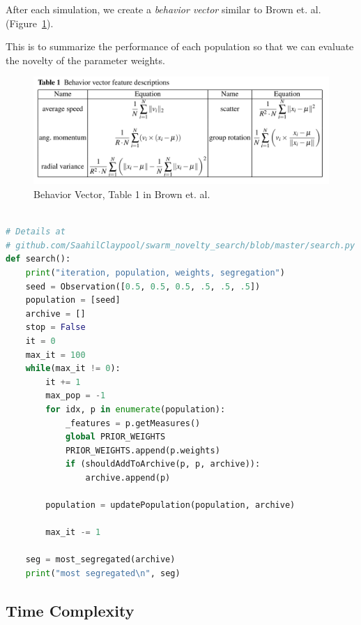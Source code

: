 After each simulation, we create a \emph{behavior vector} similar to Brown et. al. (Figure~\ref{fig:vec}).

This is to summarize the performance of each population so that we can evaluate the novelty of the parameter weights. 

\begin{figure}
    \centering
    \includegraphics[width=\linewidth]{imgs/measures.png}
    \caption{Behavior Vector, Table 1 in Brown et. al.\cite{c1}}
    \label{fig:vec}
\end{figure}

\begin{lstlisting}[caption={Search algorithm (Python)}, label={lst:search}, language=Python, breaklines=true]

# Details at 
# github.com/SaahilClaypool/swarm_novelty_search/blob/master/search.py
def search():
    print("iteration, population, weights, segregation")
    seed = Observation([0.5, 0.5, 0.5, .5, .5, .5])
    population = [seed]
    archive = []
    stop = False
    it = 0
    max_it = 100
    while(max_it != 0):
        it += 1
        max_pop = -1
        for idx, p in enumerate(population):
            _features = p.getMeasures()
            global PRIOR_WEIGHTS
            PRIOR_WEIGHTS.append(p.weights)
            if (shouldAddToArchive(p, p, archive)):
                archive.append(p)

        population = updatePopulation(population, archive)

        max_it -= 1

    seg = most_segregated(archive)
    print("most segregated\n", seg)

\end{lstlisting}

\subsection{Time Complexity}
\label{sec:time}

